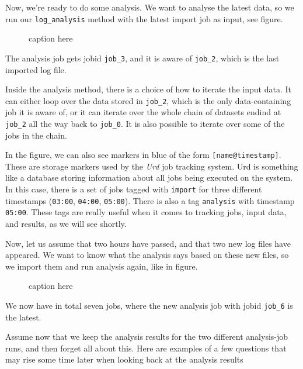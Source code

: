 \documentclass[a4paper]{article}
\begin{document}
Now, we're ready to do some analysis.  We want to analyse the latest
data, so we run our \texttt{log\_analysis} method with the latest
import job as input, see figure.
\begin{figure}[h!]
  \begin{center}
    
    \caption{caption here}
    \label{figure:example}
  \end{center}
\end{figure}
The analysis job gets jobid \texttt{job\_3}, and it is aware of
\texttt{job\_2}, which is the last imported log file.

Inside the analysis method, there is a choice of how to iterate the
input data.  It can either loop over the data stored in
\texttt{job\_2}, which is the only data-containing job it is aware of,
or it can iterate over the whole chain of datasets endind at
\texttt{job\_2} all the way back to \texttt{job\_0}.  It is also
possible to iterate over some of the jobs in the chain.

In the figure, we can also see markers in blue of the form
\texttt{[name@timestamp]}.  These are storage markers used by the
\textsl{Urd} job tracking system.  Urd is something like a database
storing information about all jobs being executed on the system.  In
this case, there is a set of jobs tagged with \texttt{import} for
three different timestamps (\texttt{03:00}, \texttt{04:00},
\texttt{05:00}).  There is also a tag \texttt{analysis} with timestamp
\texttt{05:00}.  These tags are really useful when it comes to
tracking jobs, input data, and results, as we will see shortly.

Now, let us assume that two hours have passed, and that two new log
files have appeared.  We want to know what the analysis says based on
these new files, so we import them and run analysis again, like in
figure.
\begin{figure}[h!]
  \begin{center}
    
    \caption{caption here}
    \label{figure:example}
  \end{center}
\end{figure}
We now have in total seven jobs, where the new analysis job with jobid
\texttt{job\_6} is the latest.

Assume now that we keep the analysis results for the two different
analysis-job runs, and then forget all about this.  Here are examples
of a few questions that may rise some time later when looking back at
the analysis results
\end{document}
